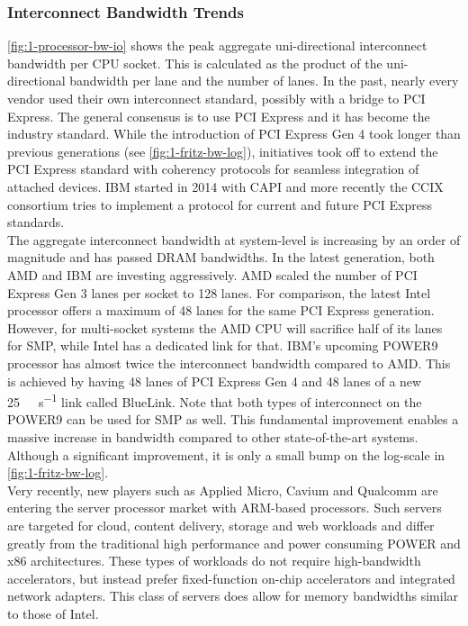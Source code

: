 \subsubsection{Interconnect Bandwidth Trends}
\autoref{fig:1-processor-bw-io} shows the peak aggregate uni-directional interconnect bandwidth per CPU socket. This is calculated as the product of the uni-directional bandwidth per lane and the number of lanes. In the past, nearly every vendor used their own interconnect standard, possibly with a bridge to PCI Express. The general consensus is to use PCI Express and it has become the industry standard. While the introduction of PCI Express Gen 4 took longer than previous generations (see \autoref{fig:1-fritz-bw-log}), initiatives took off to extend the PCI Express standard with coherency protocols for seamless integration of attached devices. IBM started in 2014 with CAPI and more recently the CCIX consortium tries to implement a protocol for current and future PCI Express standards.\\
The aggregate interconnect bandwidth at system-level is increasing by an order of magnitude and has passed DRAM bandwidths. In the latest generation, both AMD and IBM are investing aggressively. AMD scaled the number of PCI Express Gen 3 lanes per socket to 128 lanes. For comparison, the latest Intel processor offers a maximum of 48 lanes for the same PCI Express generation. However, for multi-socket systems the AMD CPU will sacrifice half of its lanes for SMP, while Intel has a dedicated link for that. IBM's upcoming POWER9 processor has almost twice the interconnect bandwidth compared to AMD. This is achieved by having 48 lanes of PCI Express Gen 4 and 48 lanes of a new \SI{25}{\giga\bit\per\second} link called BlueLink. Note that both types of interconnect on the POWER9 can be used for SMP as well. This fundamental improvement enables a massive increase in bandwidth compared to other state-of-the-art systems. Although a significant improvement, it is only a small bump on the log-scale in \autoref{fig:1-fritz-bw-log}.\\
Very recently, new players such as Applied Micro, Cavium and Qualcomm are entering the server processor market with ARM-based processors. Such servers are targeted for cloud, content delivery, storage and web workloads and differ greatly from the traditional high performance and power consuming POWER and x86 architectures. These types of workloads do not require high-bandwidth accelerators, but instead prefer fixed-function on-chip accelerators and integrated network adapters. This class of servers does allow for memory bandwidths similar to those of Intel.

